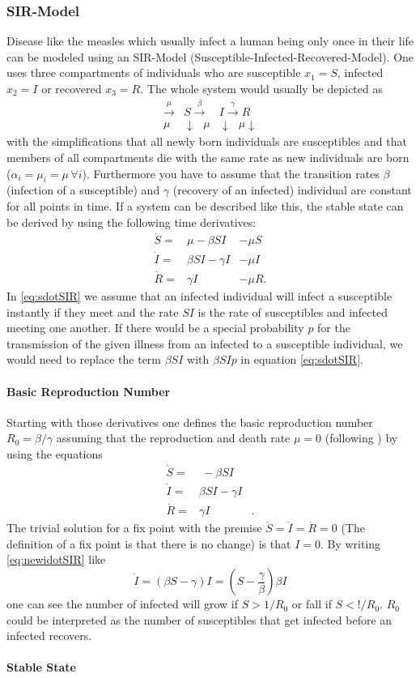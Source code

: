 \subsubsection{SIR-Model}
Disease like the measles which usually infect a human being only once in their life can be modeled using an SIR-Model (Susceptible-Infected-Recovered-Model). One uses three compartments of individuals who are susceptible $x_1 = S$, infected $x_2=I$ or recovered $x_3=R$. The whole system would usually be depicted as 
\begin{eqnarray}
\xrightarrow{\mu} &S \xrightarrow{\beta} &I  \xrightarrow{\gamma} R  \\
{\mu} & \downarrow \text{         }\mu &\downarrow \text{  } {\mu} \downarrow \nonumber
\end{eqnarray}
with the simplifications that all newly born individuals are susceptibles and that members of all compartments die with the same rate as new individuals are born ($\alpha_i = \mu_i = \mu\, \forall i$). Furthermore you have to assume that the transition rates $\beta$ (infection of a susceptible) and $\gamma$ (recovery of an infected) individual are constant for all points in time.
If a system can be described like this, the stable state can be derived by using the following time derivatives:
\begin{eqnarray}
\dot{S} =& \mu -\beta SI &-  \mu S  \label{eq:sdotSIR}\\ 
\dot{I} =& \beta SI - \gamma I  &-\mu I \\
\dot{R} =& \gamma I & -\mu R.
\end{eqnarray}
In \ref{eq:sdotSIR} we assume that an infected individual will infect a susceptible instantly if they meet and the rate $SI$ is the rate of susceptibles and infected meeting one another. If there would be a special probability $p$ for the transmission of the given illness from an infected to a susceptible individual, we would need to replace the term $\beta SI$ with $\beta S I p$ in equation \ref{eq:sdotSIR}.
\paragraph{Basic Reproduction Number}
Starting with those derivatives one defines the basic reproduction number $R_0=\beta / \gamma$ assuming that the reproduction and death rate $\mu=0$ (following \citep{AND92}) by using the equations
\begin{eqnarray}
\dot{S} =& \ -\beta SI &  \label{eq:newsdotSIR}\\ 
\dot{I} =& \beta SI - \gamma I  & \label{eq:newidotSIR}\\
\dot{R} =& \gamma I &.
\end{eqnarray}
The trivial solution for a fix point with the premise $\dot{S} = \dot{I} =\dot{R} = 0$ (The definition of a fix point is that there is no change) is that $I=0$. By writing \ref{eq:newidotSIR} like 
\begin{equation}
\dot{I} = (\beta S -\gamma) I = \left( S-\frac{\gamma}{\beta} \right) \beta I
\end{equation}
one can see the number of infected will grow if $S > 1/R_0$ or fall if $S < !/R_0$. $R_0$ could be interpreted as the number of susceptibles that get infected before an infected recovers.
\paragraph{Stable State}